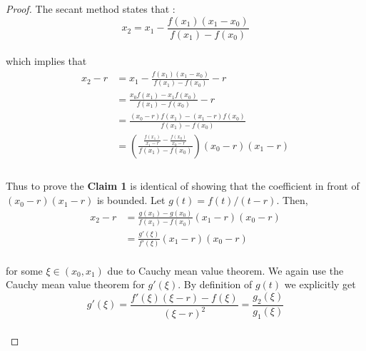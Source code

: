 \documentclass[paper=a4, fontsize=11pt]{scrartcl}
\begin{document}
\begin{proof}
	The secant method states that : \\
	
	\begin{equation}\nonumber
		x_2 = x_1 - \frac{f(x_1)(x_1 - x_0)}{f(x_1)-f(x_0)}
	\end{equation}\\
	
	which implies that \\
	
	\begin{equation}\nonumber
	\begin{split}
		x_2 - r &=  x_1 - \frac{f(x_1)(x_1 - x_0)}{f(x_1)-f(x_0)} -r \\[2.5ex]
		&= \frac{x_0 f(x_1) - x_1 f(x_0)}{f(x_1)-f(x_0)} -r \\[2.5ex]
		&= \frac{(x_0-r) f(x_1) - (x_1-r) f(x_0)}{f(x_1)-f(x_0)}  \\[2.5ex]
		&= \left(\frac{\frac{f(x_1)}{x_1 - r} - \frac{f(x_0)}{x_0 - r}}{f(x_1)-f(x_0)}\right) (x_0 -r)(x_1 - r)\\[2.5ex]
	\end{split}
	\end{equation}\\
	
	Thus to prove the \textbf{Claim 1} is identical of showing that the coefficient in front of $(x_0 -r)(x_1 - r)$ is bounded. Let $g(t) = f(t)/(t-r)$. Then, \\
	
	\begin{equation}\nonumber
		\begin{split}
		x_2 -r &= \frac{g(x_1)-g(x_0)}{f(x_1)-f(x_0)} (x_1 - r) (x_0 -r) \\[2.5ex]
		&= \frac{g'(\xi)}{f'(\xi)} (x_1 -r)(x_0 - r)
		\end{split}
	\end{equation}\\
	
	for some $\xi \in (x_0,x_1)$ due to Cauchy mean value theorem. We again use the Cauchy mean value theorem for $g'(\xi)$. By definition of $g(t)$ we explicitly get \\
	
	\begin{equation}\nonumber
		g'(\xi) = \frac{f'(\xi)(\xi - r) - f(\xi)}{(\xi - r )^2} = \frac{g_2(\xi)}{g_1(\xi)}
	\end{equation}\\
	

\end{proof}
\end{document}
